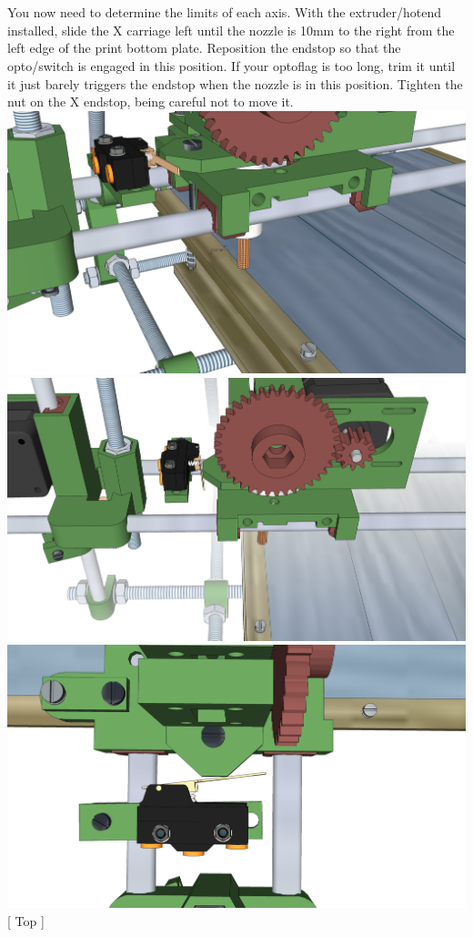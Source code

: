 \documentclass[twoside,a4paper,titlepage]{memoir}
\begin{document}
	\section{}
	You now need to determine the limits of each axis. With the extruder/hotend installed, slide the X
	carriage left until the nozzle is 10mm to the right from the left edge of the print bottom plate. Reposition
	the endstop so that the opto/switch is engaged in this position. If your optoflag is too long, trim it until it
	just barely triggers the endstop when the nozzle is in this position. Tighten the nut on the X endstop,
	being careful not to move it.\\
	\includegraphics[width=1\linewidth]{graphics/ch10_7_1.png}
	\includegraphics[width=1\linewidth]{graphics/ch10_7_2.png}
	\includegraphics[width=1\linewidth]{graphics/ch10_7_3.png}
	[ Top ]
	
\end{document}
